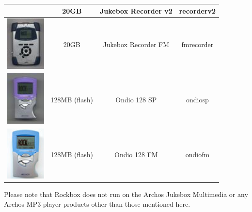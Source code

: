 \begin{center}
\begin{tabular}{@{}cccc@{}}
    & 20GB & Jukebox Recorder v2 & recorderv2\\\midrule
    \includegraphics[width=2cm]{getting_started/images/archos-recorderfm-small.png}
    & 20GB & Jukebox Recorder FM & fmrecorder \\\midrule
    \includegraphics[width=2cm]{getting_started/images/archos-ondiosp-small.png}
    & 128MB (flash) & Ondio 128 SP & ondiosp \\\midrule
    \includegraphics[width=2cm]{getting_started/images/archos-ondiofm-small.png}
    &128MB (flash) & Ondio 128 FM & ondiofm \\\bottomrule
  \end{tabular}
\end{center}
Please note that Rockbox does not run on the Archos
Jukebox Multimedia or any Archos MP3 player products other than those
mentioned here.

